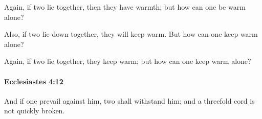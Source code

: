 			\begin{versebox}
					\item[BHS] 
					\item[LXX] 
					\item[ASV] Again, if two lie together, then they have warmth; but how can one be warm alone?
					\item[NIV] Also, if two lie down together, they will keep warm. But how can one keep warm alone?
					\item[NRSV] Again, if two lie together, they keep warm; but how can one keep warm alone?
			\end{versebox}

		\paragraph{Ecclesiastes 4:12} %
			\label{ECCLESIASTES-4-12}

			And if one prevail against him, two shall withstand him; and a threefold cord is not quickly broken.

